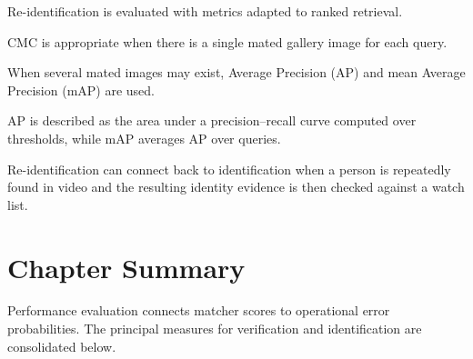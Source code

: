 \documentclass[11pt,a4paper,oneside]{report}
\begin{document}
Re-identification is evaluated with metrics adapted to ranked retrieval.

CMC is appropriate when there is a single mated gallery image for each
query.

When several mated images may exist,
Average Precision (AP) and mean Average Precision (mAP) are used.

AP is described as the area under a precision--recall curve computed
over thresholds, while mAP averages AP over queries.

Re-identification can connect back to identification when a person is
repeatedly found in video and the resulting identity evidence is then
checked against a watch list.

\section{Chapter Summary}
\label{sec:performance-summary}

Performance evaluation connects matcher scores to operational error probabilities. The principal measures for verification and identification are consolidated below.

\end{document}
